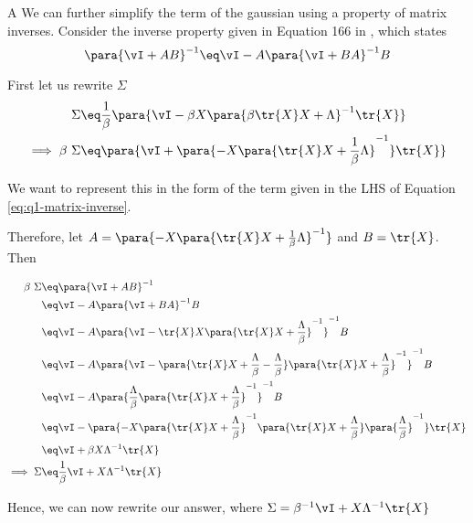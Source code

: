 \documentclass{article}
\begin{document}
\begin{question}
\begin{qpart}{A}
		We can further simplify the term of the gaussian using a property of matrix inverses. Consider the inverse property given in Equation 166 in \cite{matrix-cookbook}, which states
		\begin{equation}
			\para{\vI + AB}^{-1}	\eq	\vI - A \para{\vI + BA}^{-1} B
			\label{eq:q1-matrix-inverse}
		\end{equation}

		First let us rewrite $\Sigma$
		\begin{align*}
			\Sigma	&\eq	\frac{1}{\beta} \para{\vI - \beta X \para{\beta \tr{X} X + \Lambda}^{-1} \tr{X}} \\
			\implies \beta\ \Sigma	&\eq	\para{\vI + \para{- X \para{\tr{X} X + \frac{1}{\beta} \Lambda}^{-1}} \tr{X}}
		\end{align*}

		We want to represent this in the form of the term given in the LHS of Equation \ref{eq:q1-matrix-inverse}.

		Therefore, let $A = \para{- X \para{\tr{X} X + \frac{1}{\beta} \Lambda}^{-1}}$ and $B = \tr{X}$. Then

		\begin{align*}
			\beta\ \Sigma	&\eq	\para{\vI + AB}^{-1} \\
			&\eq	\vI - A \para{\vI + BA}^{-1} B \\
			&\eq	\vI - A \para{\vI - \tr{X} X \para{\tr{X} X + \frac{\Lambda}{\beta}}^{-1}}^{-1} B \\
			&\eq	\vI - A \para{\vI - \para{\tr{X} X + \frac{\Lambda}{\beta} - \frac{\Lambda}{\beta}} \para{\tr{X} X + \frac{\Lambda}{\beta}}^{-1}}^{-1} B \\
			&\eq	\vI - A \para{\frac{\Lambda}{\beta} \para{\tr{X} X + \frac{\Lambda}{\beta}}^{-1}}^{-1} B \\
			&\eq	\vI - \para{- X \para{\tr{X} X + \frac{\Lambda}{\beta}}^{-1} \para{\tr{X} X + \frac{\Lambda}{\beta}} \para{\frac{\Lambda}{\beta}}^{-1}} \tr{X} \\
			&\eq	\vI + \beta X \Lambda^{-1} \tr{X} \\
			\implies \Sigma	&\eq	\frac{1}{\beta} \vI + X \Lambda^{-1} \tr{X}
		\end{align*}

		Hence, we can now rewrite our answer,
		where $\Sigma = \beta^{-1} \vI + X \Lambda^{-1} \tr{X}$


\end{qpart}
\end{question}
\end{document}
